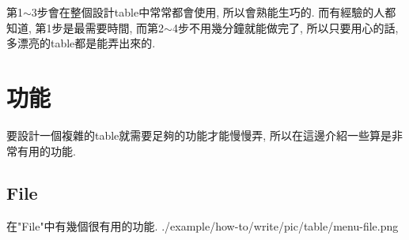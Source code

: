   第1$\sim$3步會在整個設計table中常常都會使用, 所以會熟能生巧的. 而有經驗的人都知道, 第1步是最需要時間, 而第2$\sim$4步不用幾分鐘就能做完了, 所以只要用心的話, 多漂亮的table都是能弄出來的.

\newpage
\section{功能}

要設計一個複雜的table就需要足夠的功能才能慢慢弄, 所以在這邊介紹一些算是非常有用的功能.

\subsection{File}

  在"File"中有幾個很有用的功能.
  \InsertCenterImage
    {./example/how-to/write/pic/table/menu-file.png}

